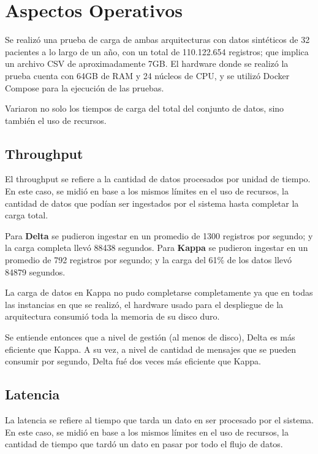 \section{Aspectos Operativos}

Se realizó una prueba de carga de ambas arquitecturas con datos sintéticos de 32 pacientes a lo largo de un año, con un total de 110.122.654 registros; 
que implica un archivo CSV de aproximadamente 7GB.
El hardware donde se realizó la prueba cuenta con 64GB de RAM y 24 núcleos de CPU, y se utilizó Docker Compose para la ejecución de las pruebas.

Variaron no solo los tiempos de carga del total del conjunto de datos, sino también el uso de recursos.

\subsection{Throughput}
El throughput se refiere a la cantidad de datos procesados por unidad de tiempo.
En este caso, se midió en base a los mismos límites en el uso de recursos, la cantidad de datos que podían ser ingestados por el sistema hasta completar la carga total.

Para \textbf{Delta} se pudieron ingestar en un promedio de 1300 registros por segundo; y la carga completa llevó 88438 segundos.
Para \textbf{Kappa} se pudieron ingestar en un promedio de 792 registros por segundo; y la carga del 61\% de los datos llevó 84879 segundos.

La carga de datos en Kappa no pudo completarse completamente ya que en todas las instancias en que se realizó, 
el hardware usado para el despliegue de la arquitectura consumió toda la memoria de su disco duro.  

Se entiende entonces que a nivel de gestión (al menos de disco), Delta es más eficiente que Kappa.
A su vez, a nivel de cantidad de mensajes que se pueden consumir por segundo, Delta fué dos veces más eficiente que Kappa.

\newpage

\subsection{Latencia}

La latencia se refiere al tiempo que tarda un dato en ser procesado por el sistema.
En este caso, se midió en base a los mismos límites en el uso de recursos, la cantidad de tiempo que tardó un dato en pasar por todo el flujo de datos.

